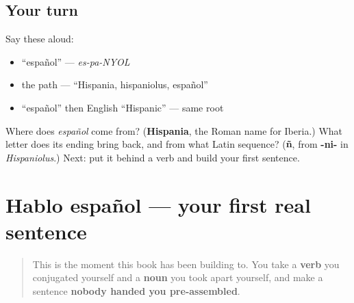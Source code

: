 \subsection*{Your turn}
Say these aloud:

\begin{itemize}
\raggedright
  \item \textquotedblleft{}español\textquotedblright{} — \emph{es-pa-NYOL}
  \item the path — \textquotedblleft{}Hispania, hispaniolus, español\textquotedblright{}
  \item \textquotedblleft{}español\textquotedblright{} then English \textquotedblleft{}Hispanic\textquotedblright{} — same root
\end{itemize}

\begin{tcolorbox}[breakable,colback=teal!4,colframe=teal!35!black,title={Before you move on}]
Where does \emph{español} come from? (\textbf{Hispania}, the Roman name for Iberia.) What letter does its ending bring back, and from what Latin sequence? (\textbf{ñ}, from \textbf{-ni-} in \emph{Hispaniolus}.) Next: put it behind a verb and build your first sentence.
\end{tcolorbox}
\section[Hablo español]{Hablo español — your first real sentence}

\label{lesson:ES-C06-hablo-espanol}



\begin{quote}
This is the moment this book has been building to. You take a \textbf{verb} you conjugated yourself and a \textbf{noun} you took apart yourself, and make a sentence \textbf{nobody handed you pre-assembled}.
\end{quote}

